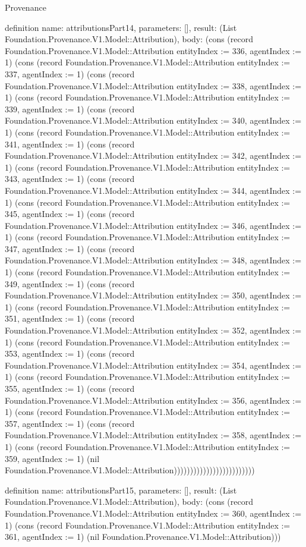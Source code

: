 \begin{lexlean}{Provenance}
\begin{semanticmodule}
definition{
  name: attributionsPart14,
  parameters: [],
  result: (List Foundation.Provenance.V1.Model::Attribution),
  body: (cons (record Foundation.Provenance.V1.Model::Attribution {entityIndex := 336, agentIndex := 1}) (cons (record Foundation.Provenance.V1.Model::Attribution {entityIndex := 337, agentIndex := 1}) (cons (record Foundation.Provenance.V1.Model::Attribution {entityIndex := 338, agentIndex := 1}) (cons (record Foundation.Provenance.V1.Model::Attribution {entityIndex := 339, agentIndex := 1}) (cons (record Foundation.Provenance.V1.Model::Attribution {entityIndex := 340, agentIndex := 1}) (cons (record Foundation.Provenance.V1.Model::Attribution {entityIndex := 341, agentIndex := 1}) (cons (record Foundation.Provenance.V1.Model::Attribution {entityIndex := 342, agentIndex := 1}) (cons (record Foundation.Provenance.V1.Model::Attribution {entityIndex := 343, agentIndex := 1}) (cons (record Foundation.Provenance.V1.Model::Attribution {entityIndex := 344, agentIndex := 1}) (cons (record Foundation.Provenance.V1.Model::Attribution {entityIndex := 345, agentIndex := 1}) (cons (record Foundation.Provenance.V1.Model::Attribution {entityIndex := 346, agentIndex := 1}) (cons (record Foundation.Provenance.V1.Model::Attribution {entityIndex := 347, agentIndex := 1}) (cons (record Foundation.Provenance.V1.Model::Attribution {entityIndex := 348, agentIndex := 1}) (cons (record Foundation.Provenance.V1.Model::Attribution {entityIndex := 349, agentIndex := 1}) (cons (record Foundation.Provenance.V1.Model::Attribution {entityIndex := 350, agentIndex := 1}) (cons (record Foundation.Provenance.V1.Model::Attribution {entityIndex := 351, agentIndex := 1}) (cons (record Foundation.Provenance.V1.Model::Attribution {entityIndex := 352, agentIndex := 1}) (cons (record Foundation.Provenance.V1.Model::Attribution {entityIndex := 353, agentIndex := 1}) (cons (record Foundation.Provenance.V1.Model::Attribution {entityIndex := 354, agentIndex := 1}) (cons (record Foundation.Provenance.V1.Model::Attribution {entityIndex := 355, agentIndex := 1}) (cons (record Foundation.Provenance.V1.Model::Attribution {entityIndex := 356, agentIndex := 1}) (cons (record Foundation.Provenance.V1.Model::Attribution {entityIndex := 357, agentIndex := 1}) (cons (record Foundation.Provenance.V1.Model::Attribution {entityIndex := 358, agentIndex := 1}) (cons (record Foundation.Provenance.V1.Model::Attribution {entityIndex := 359, agentIndex := 1}) (nil Foundation.Provenance.V1.Model::Attribution)))))))))))))))))))))))))
}

definition{
  name: attributionsPart15,
  parameters: [],
  result: (List Foundation.Provenance.V1.Model::Attribution),
  body: (cons (record Foundation.Provenance.V1.Model::Attribution {entityIndex := 360, agentIndex := 1}) (cons (record Foundation.Provenance.V1.Model::Attribution {entityIndex := 361, agentIndex := 1}) (nil Foundation.Provenance.V1.Model::Attribution)))
}


\end{semanticmodule}
\end{lexlean}
